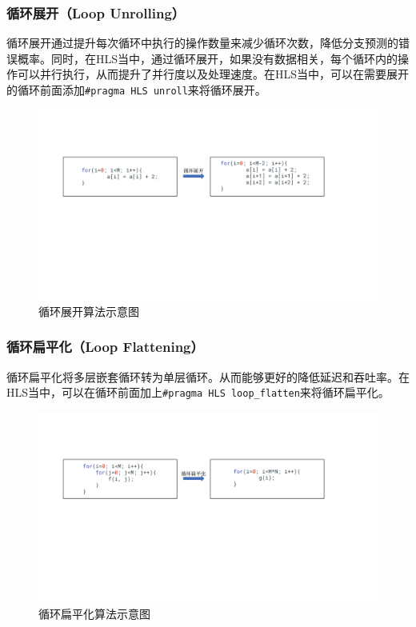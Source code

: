\subsubsection{循环展开（Loop Unrolling）}

循环展开通过提升每次循环中执行的操作数量来减少循环次数，降低分支预测的错误概率。同时，在HLS当中，通过循环展开，如果没有数据相关，每个循环内的操作可以并行执行，从而提升了并行度以及处理速度。在HLS当中，可以在需要展开的循环前面添加\verb|#pragma HLS unroll|来将循环展开。

\begin{figure}[htbp]
    \centering
    \includegraphics[width=\linewidth]{figures/loop unrolling.pdf}
    \caption{循环展开算法示意图}
    \label{fig:loop_unrolling}
\end{figure}

\subsubsection{循环扁平化（Loop Flattening）}

循环扁平化将多层嵌套循环转为单层循环。从而能够更好的降低延迟和吞吐率。在HLS当中，可以在循环前面加上\verb|#pragma HLS loop_flatten|来将循环扁平化。

\begin{figure}[htbp]
    \centering
    \includegraphics[width=\linewidth]{figures/loop flattening.pdf}
    \caption{循环扁平化算法示意图}
    \label{fig:loop_flattening}
\end{figure}

